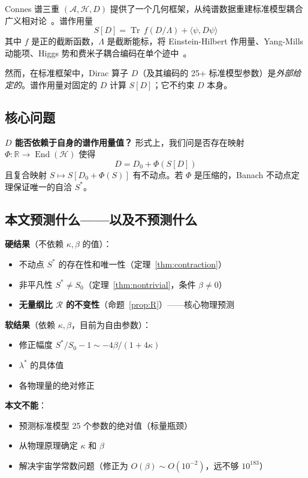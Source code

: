 \documentclass[11pt,a4paper]{ctexart}
\theoremstyle{remark}
\providecommand{\Tr}{\operatorname{Tr}}
\newcommand{\End}{\operatorname{End}}
\newcommand{\R}{\mathcal{R}}
\begin{document}
Connes 谱三重 $(\mathcal{A}, \mathcal{H}, D)$ 提供了一个几何框架，从纯谱数据重建标准模型耦合广义相对论~\cite{Con94, CCM06}。谱作用量
\[
  S[D] = \Tr\, f(D/\Lambda) + \langle\psi, D\psi\rangle
\]
其中 $f$ 是正的截断函数，$\Lambda$ 是截断能标，将 Einstein-Hilbert 作用量、Yang-Mills 动能项、Higgs 势和费米子耦合编码在单个迹中~\cite{CC96}。

然而，在标准框架中，Dirac 算子 $D$（及其编码的 25+ 标准模型参数）是\emph{外部给定的}。谱作用量对固定的 $D$ 计算 $S[D]$；它不约束 $D$ 本身。

\subsection{核心问题}

\textbf{$D$ 能否依赖于自身的谱作用量值？} 形式上，我们问是否存在映射 $\Phi: \mathbb{R} \to \End(\mathcal{H})$ 使得
\[
  D = D_0 + \Phi(S[D])
\]
且复合映射 $S \mapsto S[D_0 + \Phi(S)]$ 有不动点。若 $\Phi$ 是压缩的，Banach 不动点定理保证唯一的自洽 $S^*$。

\subsection{本文预测什么——以及不预测什么}

\textbf{硬结果}（不依赖 $\kappa, \beta$ 的值）：
\begin{itemize}
  \item 不动点 $S^*$ 的存在性和唯一性（定理~\ref{thm:contraction}）
  \item 非平凡性 $S^* \neq S_0$（定理~\ref{thm:nontrivial}，条件 $\beta \neq 0$）
  \item \textbf{无量纲比 $\R$ 的不变性}（命题~\ref{prop:R}）——核心物理预测
\end{itemize}

\textbf{软结果}（依赖 $\kappa, \beta$，目前为自由参数）：
\begin{itemize}
  \item 修正幅度 $S^*/S_0 - 1 \sim -4\beta/(1+4\kappa)$
  \item $\lambda^*$ 的具体值
  \item 各物理量的绝对修正
\end{itemize}

\textbf{本文不能}：
\begin{itemize}
  \item 预测标准模型 25 个参数的绝对值（标量瓶颈）
  \item 从物理原理确定 $\kappa$ 和 $\beta$
  \item 解决宇宙学常数问题（修正为 $O(\beta) \sim O(10^{-2})$，远不够 $10^{183}$）
\end{itemize}
\end{document}
